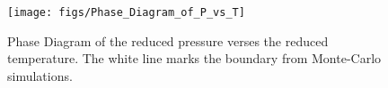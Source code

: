 \documentclass[double,12pt]{beavtex}
\begin{document}
\begin{figure}
  \centering
  \texttt{[image: figs/Phase\_Diagram\_of\_P\_vs\_T]}
  \caption{Phase Diagram of the reduced pressure verses the reduced temperature. 
  The white line marks the boundary from Monte-Carlo simulations.}
  \label{fig:Phase_Diagram_P_vs_T}
\end{figure}

\begin{figure}
  \centering
  \label{fig:Phase_Diagram_P_vs_T_AS}
\end{figure}


\begin{figure}
  \centering
  \label{fig:p-vs-T_at_fixed_density}
\end{figure}



\end{document}
